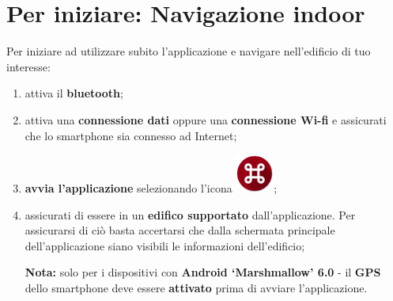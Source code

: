 \documentclass[../ClipsManualeUtente.tex]{subfiles}
\begin{document}
\section{Per iniziare: Navigazione indoor}
	Per iniziare ad utilizzare subito l'applicazione e navigare nell'edificio di tuo interesse:
	\begin{enumerate}
		\item attiva il \textbf{bluetooth};
		\item attiva una \textbf{connessione dati} oppure una \textbf{connessione Wi-fi} e assicurati che lo smartphone sia connesso ad Internet;
		\item \textbf{avvia l'applicazione} selezionando l'icona \includegraphics[scale=0.4]{img/LogoApp};
		\item assicurati di essere in un \textbf{edifico supportato} dall'applicazione. Per assicurarsi di ciò basta accertarsi che dalla schermata principale dell'applicazione siano visibili le informazioni dell'edificio;
		
		\begin{framed}
			\textbf{Nota:} solo per i dispositivi con \textbf{Android `Marshmallow' 6.0} - il \textbf{GPS} dello smartphone deve essere \textbf{attivato} prima di avviare l'applicazione.
		\end{framed}
		

\end{enumerate}
\end{document}
